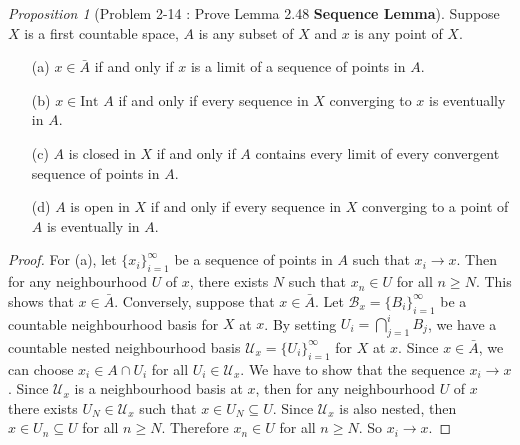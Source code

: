 \documentclass[a4paper]{article}
\theoremstyle{remark}
\newtheorem{prop}{Proposition}
\newcommand{\subhim}{\subseteq} %
\begin{document}
\begin{prop}[Problem 2-14 \cite{LeeTM} : Prove Lemma 2.48 \textbf{Sequence Lemma}]
Suppose $X$ is a first countable space, $A$ is any subset of $X$ and $x$ is any point of $X$.
\begin{enumerate}[nolistsep]
\item[(a)] $x \in\bar{A}$ if and only if $x$ is a limit of a sequence of points in $A$.
\item[(b)] $x \in \text{Int }A$ if and only if every sequence in $X$ converging to $x$ is eventually in $A$.
\item[(c)] $A$ is closed in $X$ if and only if $A$ contains every limit of every convergent sequence of points in $A$.
\item[(d)] $A$ is open in $X$ if and only if every sequence in $X$ converging to a point of $A$ is eventually in $A$. 
\end{enumerate}
\end{prop}
\begin{proof}
For (a), let  $\{x_i\}_{i=1}^\infty$ be a sequence of points in $A$ such that $x_i \to x$. Then for any neighbourhood $U$ of $x$, there exists $N$ such that $x_n \in U$ for all $n \geq N$. This shows that $x \in \bar{A}$. Conversely, suppose that $x\in \bar{A}$. Let $\mathscr{B}_x = \{B_i\}_{i=1}^{\infty}$ be a countable neighbourhood basis for $X$ at $x$. By setting $U_i = \bigcap_{j=1}^{i} B_j$, we have a countable nested neighbourhood basis $\mathscr{U}_x = \{U_i\}_{i=1}^{\infty}$ for $X$ at $x$.  Since $x \in \bar{A}$, we can choose $x_i \in A \cap U_i $ for all $U_i \in \mathscr{U}_x$. We have to show that the sequence $x_i \to x$. Since $\mathscr{U}_x $ is a neighbourhood basis at $x$, then for any neighbourhood $U$ of $x$ there exists $U_N \in \mathscr{U}_x $ such that $x \in U_N \subhim U$. Since $\mathscr{U}_x $ is also nested, then $x \in U_n \subhim U$ for all $n \geq N$. Therefore $x_n \in U$ for all $n \geq N$. So $x_i \to x$.   
\end{proof}
\end{document}
